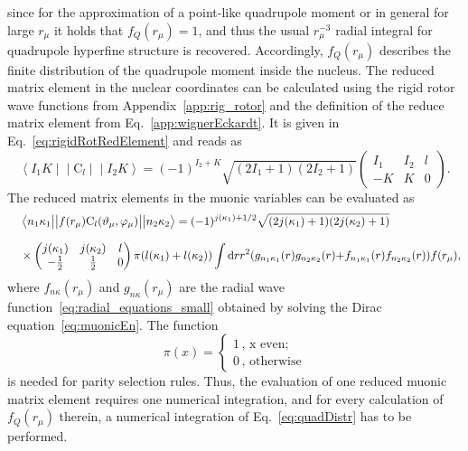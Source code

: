 since for the approximation of a point-like quadrupole moment or in general for large $r_\mu$ it holds that $f_Q(r_\mu)=1$, and thus the usual $r_\mu^{-3}$ radial integral for quadrupole hyperfine structure is recovered. Accordingly, $f_Q(r_\mu)$ describes the finite distribution of the quadrupole moment inside the nucleus. The reduced matrix element in the nuclear coordinates can be calculated using the rigid rotor wave functions from Appendix~\ref{app:rig_rotor} and the definition of the reduce matrix element from Eq.~\eqref{app:wignerEckardt}. It is given in Eq.~\eqref{eq:rigidRotRedElement} and reads as
\begin{equation}
\left< I_1K\middle|\middle|\text{C}_l\middle|\middle|I_2K\right>=(-1)^{I_2+K}
\sqrt{(2I_1+1)(2I_2+1)}
\left(
\begin{matrix}
I_1&I_2&l\\
-K&K&0
\end{matrix}
\right).
\end{equation}
The reduced matrix elements in the muonic variables can be evaluated as~\cite{johnson2007}
\begin{alignat}{2}
&&&\left< n_1\kappa_1\big{|}\big{|}f(r_\mu)\text{C}_l(\vartheta_\mu,\varphi_\mu) \big{|}\big{|}n_2\kappa_2\right> =
 (-1)^{j(\kappa_1)+1/2} \sqrt{(2j(\kappa_1)+1)(2j(\kappa_2)+1)}
\notag\\[7.5pt]
&&&\times
\left(
\begin{matrix}
j(\kappa_1)&j(\kappa_2)&l\\
-\frac{1}{2}&\frac{1}{2}&0
\end{matrix}
\right)\pi(l(\kappa_1)+l(\kappa_2))\int \text{d}rr^2 ({g_{n_1\kappa_1}(r)g_{n_2\kappa_2}(r)}{+}{f_{n_1\kappa_1}(r)f_{n_2\kappa_2}(r)}) f(r_\mu),
\end{alignat}
where $f_{n\kappa}(r_\mu)$ and $g_{n\kappa}(r_\mu)$ are the radial wave function~\eqref{eq:radial_equations_small} obtained by solving the Dirac equation~\eqref{eq:muonicEn}.
The function
\begin{equation}
\label{eq:parityFunc}
\pi(x) =
\left\{
\begin{matrix}
1\,\text{, x even;}\phantom{11}\\
0\,\text{, otherwise}
\end{matrix}
\right.
\end{equation}
is needed for parity selection rules.
Thus, the evaluation of one reduced muonic matrix element requires one numerical integration, and for every calculation of $f_Q(r_\mu)$ therein, a numerical integration of Eq.~\eqref{eq:quadDistr} has to be performed.

